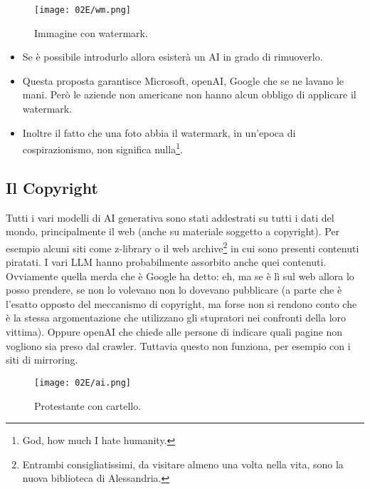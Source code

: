 \begin{figure}[H]
    \centering
    \texttt{[image: 02E/wm.png]}
    \caption{Immagine con watermark.}
\end{figure}



\begin{itemize}
  \item Se è possibile introdurlo allora esisterà un AI in grado di rimuoverlo. 
  \item Questa proposta garantisce Microsoft, openAI, Google che se ne lavano le mani. Però le aziende non americane non hanno alcun obbligo di applicare il watermark.
  \item Inoltre il fatto che una foto abbia il watermark, in un'epoca di cospirazionismo, non significa nulla\footnote{God, how much I hate humanity.}.
\end{itemize}

\subsection{Il Copyright}

Tutti i vari modelli di AI generativa sono stati addestrati su tutti i dati del mondo, principalmente il web (anche su materiale soggetto a copyright). Per esempio alcuni siti come z-library o il web archive\footnote{Entrambi consigliatissimi, da visitare almeno una volta nella vita, sono la nuova biblioteca di Alessandria.} in cui sono presenti contenuti piratati. I vari LLM hanno probabilmente assorbito anche quei contenuti. Ovviamente quella merda che è Google ha detto: eh, ma se è lì sul web allora lo posso prendere, se non lo volevano non lo dovevano pubblicare (a parte che è l'esatto opposto del meccanismo di copyright, ma forse non si rendono conto che è la stessa argomentazione che utilizzano gli stupratori nei confronti della loro vittima). Oppure openAI che chiede alle persone di indicare quali pagine non vogliono sia preso dal crawler. Tuttavia questo non funziona, per esempio con i siti di mirroring.

\begin{figure}[H]
    \centering
    \texttt{[image: 02E/ai.png]}
    \caption{Protestante con cartello.}
\end{figure}






